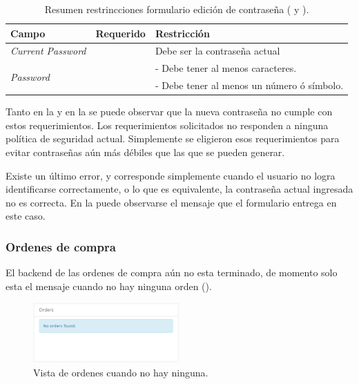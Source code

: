 \begin{table}[H]
    \centering
	\begin{tabular}{ |l|c||l| }
		\hline Campo & Requerido & Restricción \\ \hline
		\multirow{1}{*}{\textit{Current Password}} 	&  \checkmark 					&  Debe ser la contraseña actual\\ \hline
		\multirow{2}{*}{\textit{Password}} 			&  \multirow{2}{*}{\checkmark}	&  - Debe tener al menos  caracteres.\\
													&  								&  - Debe tener al menos un número ó símbolo.\\ \hline
	\end{tabular}
 	\caption{Resumen restrincciones formulario edición de contraseña (  y ).}
    \label{tab:profile:form:restrictions:update_password}
\end{table}


Tanto en la  y en la  se puede observar que la nueva contraseña no cumple con estos requerimientos.
Los requerimientos solicitados no responden a ninguna política de seguridad actual. Simplemente se eligieron esos requerimientos para evitar contraseñas aún más débiles que las que se pueden generar.


Existe un último error, y corresponde simplemente cuando el usuario no logra identificarse correctamente, o lo que es equivalente, la contraseña actual ingresada no es correcta. En la  puede observarse el mensaje que el formulario entrega en este caso.


\subsubsection{Ordenes de compra}

	El backend de las ordenes de compra aún no esta terminado, de momento solo esta el mensaje cuando no hay ninguna orden ().

	\begin{figure}[H]
	\centering
	\includegraphics[width=0.5\textwidth]{figuras/profile/orders_empty.png}

	\caption{Vista de ordenes cuando no hay ninguna.}
	\label{figure:profile:orders_empty}
\end{figure}



